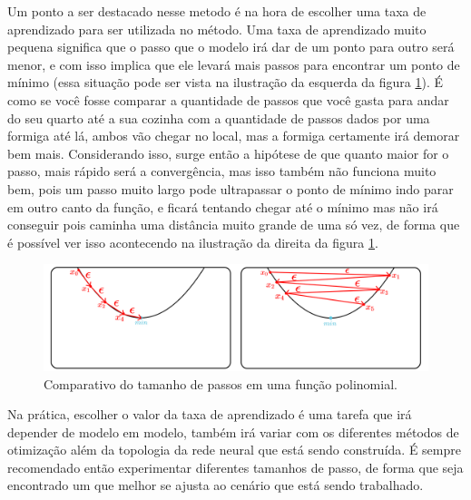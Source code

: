 Um ponto a ser destacado nesse metodo é na hora de escolher uma taxa de aprendizado para ser utilizada no método. Uma taxa de aprendizado muito pequena significa que o passo que o modelo irá dar de um ponto para outro será menor, e com isso implica que ele levará mais passos para encontrar um ponto de mínimo (essa situação pode ser vista na ilustração da esquerda da figura \ref{fig:comparativo-tamanho-do-passo}). É como se você fosse comparar a quantidade de passos que você gasta para andar do seu quarto até a sua cozinha com a quantidade de passos dados por uma formiga até lá, ambos vão chegar no local, mas a formiga certamente irá demorar bem mais. Considerando isso, surge então a hipótese de que quanto maior for o passo, mais rápido será a convergência, mas isso também não funciona muito bem, pois um passo muito largo pode ultrapassar o ponto de mínimo indo parar em outro canto da função, e ficará tentando chegar até o mínimo mas não irá conseguir pois caminha uma distância muito grande de uma só vez, de forma que é possível ver isso acontecendo na ilustração da direita da figura \ref{fig:comparativo-tamanho-do-passo}.

\begin{figure}[h!]
    \centering
    \includegraphics[width=1\linewidth]{../imagens/retropropagacao-gradiente/comparativo-de-passos.png}
    \caption{Comparativo do tamanho de passos em uma função polinomial.}
    \label{fig:comparativo-tamanho-do-passo}
\end{figure}

Na prática, escolher o valor da taxa de aprendizado é uma tarefa que irá depender de modelo em modelo, também irá variar com os diferentes métodos de otimização além da topologia da rede neural que está sendo construída. É sempre recomendado então experimentar diferentes tamanhos de passo, de forma que seja encontrado um que melhor se ajusta ao cenário que está sendo trabalhado.

